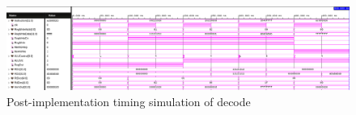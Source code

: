 \documentclass[CMPE]{../KGCOEReport}
\begin{document}
    \begin{figure}[h!]
        \centering
        \includegraphics[width=\textwidth]{img/impl_decode}
        \caption{Post-implementation timing simulation of decode}
        \label{fig:demo1}
	\end{figure}
\end{document}
